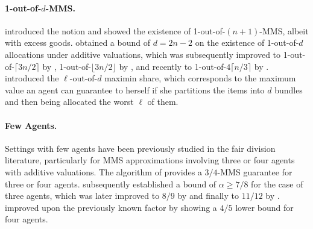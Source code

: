 \paragraph{1-out-of-$d$-MMS.} \cite{BudishMMS} introduced the notion and showed the existence of 1-out-of-$(n+1)$-MMS, albeit with excess goods. \cite{Aigner-HorevSH22} obtained a bound of $d=2n-2$ on the existence of 1-out-of-$d$ allocations under additive valuations, which was subsequently improved to 1-out-of-$\lceil 3n/2 \rceil$ by \cite{HosseiniS21}, 1-out-of-$\lfloor 3n/2 \rfloor$ by \cite{HosseiniSSH22}, and recently to 1-out-of-$4\lceil n/3 \rceil$ by \cite{AkramiGST24}.
\cite{BabaioffNT21} introduced the $\ell$-out-of-$d$ maximin share, which corresponds to the maximum value an agent can guarantee to herself if she partitions the items into $d$ bundles and  then being allocated the worst $\ell$ of them. 



\paragraph{Few Agents.} Settings with few agents have been previously studied in the fair division literature, particularly for MMS approximations involving three or four agents with additive valuations. The algorithm of \cite{KurokawaProcacciaWang18} provides a $3/4$-MMS guarantee for three or four agents. \cite{AmanatidisMNS17} subsequently established a bound of $\alpha \ge 7/8$ for the case of three agents, which was later improved to $8/9$ by \cite{GourvesMonnot19} and finally to $11/12$ by \cite{FeigeNorkinMMS}. \cite{GhodsiHSSY21} improved upon the previously known factor by showing a $4/5$ lower bound for four agents. 










